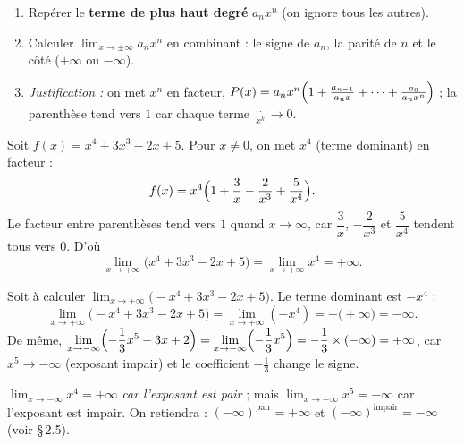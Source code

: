 \documentclass[11pt,a4paper]{article}
\begin{document}
\begin{methode}
\begin{enumerate}[leftmargin=1.9em,topsep=2pt,itemsep=2pt]
  \item Repérer le \textbf{terme de plus haut degré} $a_n x^n$ (on ignore tous les autres).
  \item Calculer $\displaystyle\lim_{x\to\pm\infty} a_n x^n$ en combinant : le signe de $a_n$, la parité de $n$ et le côté ($+\infty$ ou $-\infty$).
  \item \emph{Justification :} on met $x^n$ en facteur, $P(x)=a_n x^n\Bigl(1+\tfrac{a_{n-1}}{a_n x}+\dots+\tfrac{a_0}{a_n x^n}\Bigr)$ ; la parenthèse tend vers $1$ car chaque terme $\tfrac{\cdot}{x^k}\to 0$.
\end{enumerate}
\end{methode}

\begin{exemple}
Soit $f(x)=x^4+3x^3-2x+5$. Pour $x\neq 0$, on met $x^4$ (terme dominant) en facteur :
\[ f(x)=x^4\Bigl(1+\frac{3}{x}-\frac{2}{x^3}+\frac{5}{x^4}\Bigr). \]
Le facteur entre parenthèses tend vers $1$ quand $x\to\infty$, car $\dfrac3x$, $-\dfrac{2}{x^3}$ et
$\dfrac{5}{x^4}$ tendent tous vers $0$. D'où
\[ \lim_{x\to+\infty}\bigl(x^4+3x^3-2x+5\bigr)=\lim_{x\to+\infty} x^4=+\infty. \]
\end{exemple}

\begin{exemple}
Soit à calculer $\displaystyle\lim_{x\to+\infty}\bigl(-x^4+3x^3-2x+5\bigr)$. Le terme dominant est $-x^4$ :
\[ \lim_{x\to+\infty}\bigl(-x^4+3x^3-2x+5\bigr)=\lim_{x\to+\infty}(-x^4)=-\bigl(\!+\infty\bigr)=-\infty. \]
De même, $\displaystyle\lim_{x\to-\infty}\Bigl(-\frac13 x^5-3x+2\Bigr)=\lim_{x\to-\infty}\Bigl(-\frac13 x^5\Bigr)=-\frac13\times(-\infty)=+\infty$,
car $x^5\to-\infty$ (exposant impair) et le coefficient $-\tfrac13$ change le signe.
\end{exemple}

\begin{attention}
$\displaystyle\lim_{x\to-\infty} x^4=+\infty$ \emph{car l'exposant est pair} ; mais
$\displaystyle\lim_{x\to-\infty} x^5=-\infty$ car l'exposant est impair. On retiendra :
$(-\infty)^{\text{pair}}=+\infty$ et $(-\infty)^{\text{impair}}=-\infty$ (voir \S\,2.5).
\end{attention}
\end{document}
